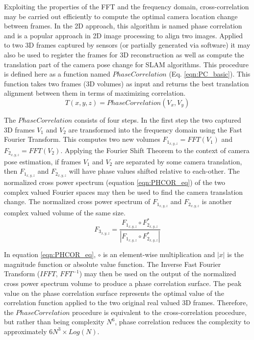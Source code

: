 Exploiting the properties of the FFT and the frequency domain, cross-correlation may be carried out efficiently to compute the optimal camera location change between frames. In the 2D approach, this algorithm is named phase correlation and is a popular approach in 2D image processing to align two images. Applied to two 3D frames captured by sensors (or partially generated via software) it may also be used to register the frames for 3D reconstruction as well as compute the translation part of the camera pose change for SLAM algorithms. This procedure is defined here as a function named $PhaseCorrelation$ (Eq. \ref{eqn:PC_basic}). This function takes two frames (3D volumes) as input and returns the best translation alignment between them in terms of maximizing correlation.  \\

\begin{equation} \label{eqn:PC_basic}
T(x, y, z) = PhaseCorrelation(V_x, V_y)
\end{equation}

The $PhaseCorrelation$ consists of four steps. In the first step the two captured 3D frames $V_1$ and $V_2$ are transformed into the frequency domain using the Fast Fourier Transform. This computes two new volumes $F_{1_{x,y,z}} = FFT(V_1)$ and $F_{2_{x,y,z}} = FFT(V_2)$. Applying the Fourier Shift Theorem to the context of camera pose estimation, if frames $V_1$ and $V_2$ are separated by some camera translation, then $F_{1_{x,y,z}}$ and $F_{2_{x,y,z}}$ will have phase values shifted relative to each-other. The normalized cross power spectrum (equation \ref{eqn:PHCOR_eq}) of the two complex valued Fourier spaces may then be used to find the camera translation change. The normalized cross power spectrum of $F_{1_{x,y,z}}$ and $F_{2_{x,y,z}}$ is another complex valued volume of the same size. \\

\begin{equation} \label{eqn:PHCOR_eq}
F_{3_{x,y,z}} = \frac{F_{1_{x,y,z}} \circ F_{2_{x,y,z}}^*}{ | F_{1_{x,y,z}} \circ F_{2_{x,y,z}}^* | }
\end{equation}

In equation \ref{eqn:PHCOR_eq}, $\circ$ is an element-wise multiplication and $|x|$ is the magnitude function or absolute value function. The Inverse Fast Fourier Transform ($IFFT$, $FFT^{-1}$) may then be used on the output of the normalized cross power spectrum volume to produce a phase correlation surface. The peak value on the phase correlation surface represents the optimal value of the correlation function applied to the two original real valued 3D frames. Therefore, the $PhaseCorrelation$ procedure is equivalent to the cross-correlation procedure, but rather than being complexity $N^6$, phase correlation reduces the complexity to approximately $6N^3 \times Log(N)$. \\


